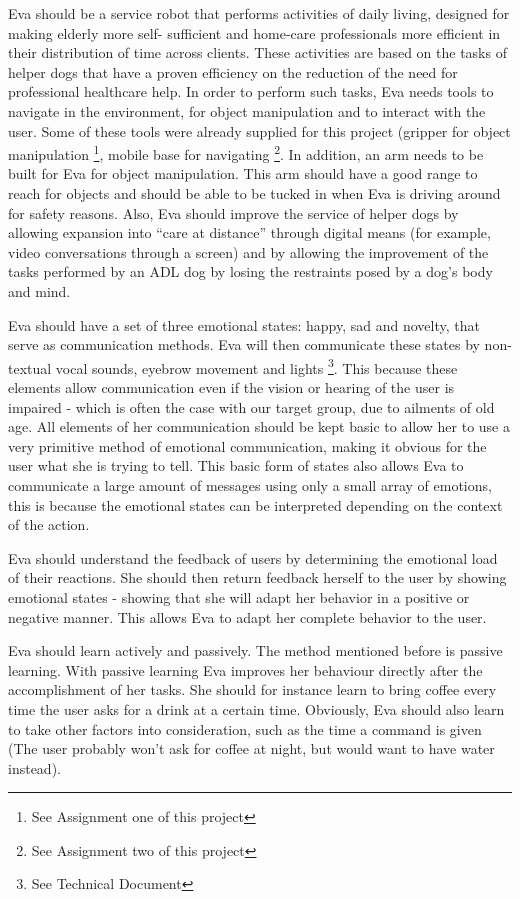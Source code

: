 \documentclass[project_eva.tex]{subfiles}
\begin{document}
Eva should be a service robot that performs activities of daily living, designed for making elderly more self-
sufficient\cite{Forlizzi} and home-care professionals more efficient in their distribution of time across clients. These 
activities are based on the tasks of helper dogs that have a proven efficiency on the reduction of the need for 
professional healthcare help\cite{Diepenhorst}. In order to perform such tasks, Eva needs tools to navigate in the 
environment, for object manipulation and to interact with the user. Some of these tools were already supplied for this 
project (gripper for object manipulation \footnote{See Assignment one of this project}, mobile base for navigating 
\footnote{See Assignment two of this project}. In addition, an arm needs to be built for Eva for object manipulation. This arm should have a good range to reach for objects and should be able to be tucked in when Eva is driving around for safety reasons. Also, Eva should improve the service of helper dogs by allowing expansion into ``care at distance'' \cite{Evers} through digital means (for example, video conversations through a screen) and by allowing the improvement of the tasks performed by an ADL dog by losing the restraints posed by a dog’s body and mind.

Eva should have a set of three emotional states: happy, sad and novelty, that serve as communication methods. Eva will then 
communicate these states by non-textual vocal sounds, eyebrow movement and lights \footnote{See Technical Document}. This 
because these elements allow communication even if the vision or hearing of the user is impaired - which is often the case 
with our target group, due to ailments of old age. All elements of her communication should be kept basic to allow her to 
use a very primitive method of emotional communication, making it obvious for the user what she is trying to tell. This 
basic form of states also allows Eva to communicate a large amount of messages using only a small array of emotions, this 
is because the emotional states can be interpreted depending on the context of the action.

Eva should understand the feedback of users by determining the emotional load of their reactions. She should then return 
feedback herself to the user by showing emotional states - showing that she will adapt her behavior in a positive or 
negative manner. This allows Eva to adapt her complete behavior to the user.

Eva should learn actively and passively. The method mentioned before is passive learning. With passive learning Eva 
improves her behaviour directly after the accomplishment of her tasks. She should for instance learn to bring coffee every 
time the user asks for a drink at a certain time. Obviously, Eva should also learn to take other factors into consideration, such as the time a command is given (The user probably won't ask for coffee at night, but would want to have water instead).
\end{document}
